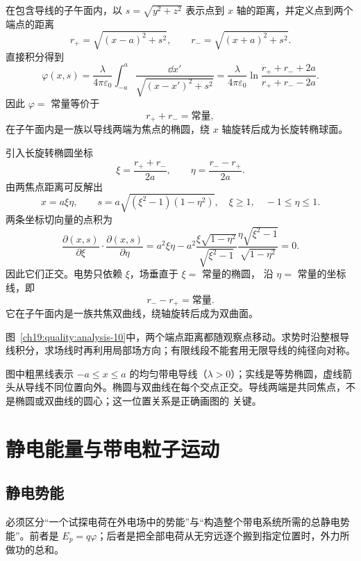 \begin{xesolution}
在包含导线的子午面内，以 $s=\sqrt{y^2+z^2}$ 表示点到 $x$ 轴的距离，并定义点到两个端点的距离
\[
  r_+=\sqrt{(x-a)^2+s^2},
  \qquad r_-=\sqrt{(x+a)^2+s^2}.
\]
直接积分得到
\[
  \varphi(x,s)=\frac{\lambda}{4\pi\varepsilon_0}
  \int_{-a}^{a}\frac{\dd x'}{\sqrt{(x-x')^2+s^2}}
  =\boxed{\frac{\lambda}{4\pi\varepsilon_0}
  \ln\frac{r_++r_-+2a}{r_++r_--2a}}.
\]
因此 $\varphi=$ 常量等价于
\[
  \boxed{r_++r_-=\text{常量}},
\]
在子午面内是一族以导线两端为焦点的椭圆，绕 $x$ 轴旋转后成为长旋转椭球面。

引入长旋转椭圆坐标
\[
  \xi=\frac{r_++r_-}{2a},
  \qquad \eta=\frac{r_--r_+}{2a}.
\]
由两焦点距离可反解出
\[
 x=a\xi\eta,\qquad s=a\sqrt{(\xi^2-1)(1-\eta^2)},\quad \xi\ge1,\quad -1\le\eta\le1.
\]
两条坐标切向量的点积为
\[
 \frac{\partial(x,s)}{\partial\xi}\cdot\frac{\partial(x,s)}{\partial\eta}
 =a^2\xi\eta-
 a^2\frac{\xi\sqrt{1-\eta^2}}{\sqrt{\xi^2-1}}
 \frac{\eta\sqrt{\xi^2-1}}{\sqrt{1-\eta^2}}=0.
\]
因此它们正交。电势只依赖 $\xi$，场垂直于 $\xi=$ 常量的椭圆，
沿 $\eta=$ 常量的坐标线，即
\[
  \boxed{r_--r_+=\text{常量}}.
\]
它在子午面内是一族共焦双曲线，绕轴旋转后成为双曲面。

\begin{qualityfigure}
\ThFiniteRodAnalysisDrawing
{}\label{ch19:quality:analysis-10}
\end{qualityfigure}
图~\ref{ch19:quality:analysis-10}中，两个端点距离都随观察点移动。求势时沿整根导线积分，求场线时再利用局部场方向；有限线段不能套用无限导线的纯径向对称。

图中粗黑线表示 $-a\le x\le a$ 的均匀带电导线（$\lambda>0$）；实线是等势椭圆，虚线箭头从导线不同位置向外。椭圆与双曲线在每个交点正交。导线两端是共同焦点，不是椭圆或双曲线的圆心；这一位置关系是正确画图的
关键。
\end{xesolution}



\section{静电能量与带电粒子运动}

\subsection{静电势能}


必须区分“一个试探电荷在外电场中的势能”与“构造整个带电系统所需的总静电势能”。前者是
$E_p=q\varphi$；后者是把全部电荷从无穷远逐个搬到指定位置时，外力所做功的总和。

